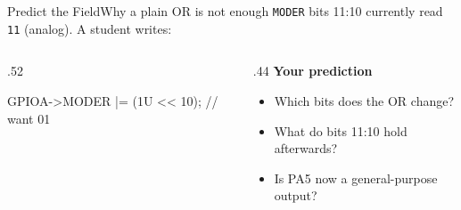 \documentclass[9pt,aspectratio=169,xcolor=table]{beamer}
\begin{document}
{\beamerextras
\begin{frame}[fragile]{Predict the Field}{Why a plain OR is not enough}
    \leavevmode
    \texttt{MODER} bits 11:10 currently read \texttt{11} (analog). A student writes:

    \vspace{2mm}
    \begin{columns}[T]
    \begin{column}{.52\textwidth}
\begin{cc}[basicstyle=\ttfamily\small]
GPIOA->MODER |= (1U << 10);   // want 01
\end{cc}
    \end{column}
    \begin{column}{.44\textwidth}
        \textbf{Your prediction}
        {\small
        \begin{itemize}\itemsep2pt
            \item Which bits does the OR change?
            \item What do bits 11:10 hold afterwards?
            \item Is PA5 now a general-purpose output?
        \end{itemize}}
    \end{column}
    \end{columns}

    \vspace{2mm}
\end{frame}
}
\end{document}
